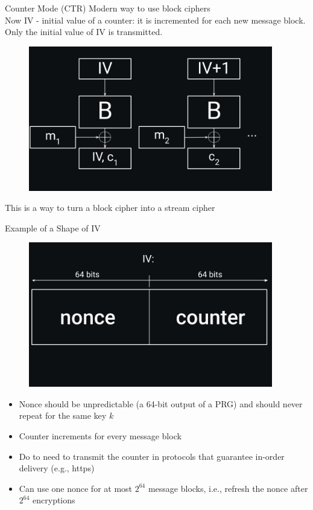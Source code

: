 \documentclass[usenames,dvipsnames, 9pt]{beamer}
\begin{document}
\begin{frame}{Counter Mode (CTR)}
\Large
Modern way to use block ciphers \\
Now IV - initial value of a counter: it is incremented for each new message block. Only the initial value of IV is transmitted.
\begin{figure}
	\includegraphics[width=0.95\textwidth]{CTR}
\end{figure}
\vspace{-20pt}
This is a way to turn a block cipher into a stream cipher \\

\end{frame}

\begin{frame}{Example of a Shape of IV}
	\begin{figure}
		\includegraphics[width=0.95\textwidth]{ShapeOfIV}
	\end{figure}
\vspace*{-40pt}
\large
\begin{itemize}
\item Nonce should be unpredictable (a 64-bit output of a PRG) and should never repeat for the same key $k$\\
\item Counter increments for every message block
\item Do to need to transmit the counter in protocols that guarantee in-order delivery (e.g., https)
\item Can use one nonce for at most $2^{64}$ message blocks, i.e., refresh the nonce after $2^{64}$ encryptions

\end{itemize}
\end{frame}
\end{document}
